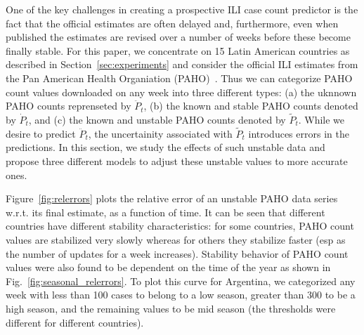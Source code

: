 One of the key challenges in creating a prospective ILI case count
predictor is the fact that the official estimates are often 
delayed and, furthermore, even when published the estimates are revised
over a number of weeks before these become finally stable.
For this paper, we concentrate on 15 Latin American countries 
as described in Section~\ref{sec:experiments} and consider the official 
ILI estimates from the Pan American Health Organiation (PAHO)~\cite{PAHO:2013}.
Thus we can categorize PAHO count values downloaded on any week
into three different types: (a) the uknnown
PAHO counts reprenseted  by $\ddot{P}_t$, (b) the known and stable PAHO counts
denoted by $\dot{P}_t$, and (c) the known and unstable PAHO counts denoted by
$\tilde{P}_t$. While we desire to predict $\ddot{P}_t$, the uncertainity associated
with $\tilde{P}_t$ introduces errors in the predictions. In this section, 
we study the effects of such unstable data and propose 
three different models to adjust these unstable
values to more accurate ones.


Figure~\ref{fig:relerrors} plots the relative error of an unstable PAHO data series w.r.t.
its final estimate, as a function of time. It can be seen that different countries 
have different stability characteristics: 
for some countries, PAHO count values are
stabilized very slowly whereas for others they stabilize faster (esp as the number of
updates for a week increases).
Stability behavior of PAHO count values were also found to be dependent on the 
time of the year as shown in Fig.~\ref{fig:seasonal_relerrors}.
To plot this curve for Argentina, we categorized any week with less than 100 cases to belong to a low season,
greater than 300 to be a high season, and the remaining values to be mid season (the thresholds
were different for different countries).


